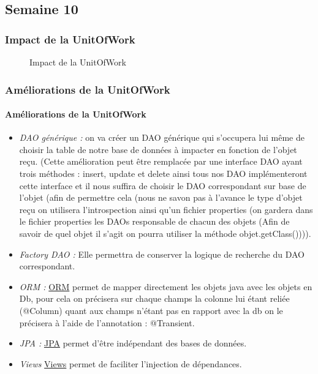 \documentclass{article}[12pt]
\begin{document}
\subsection{Semaine 10}
\subsubsection{Impact de la UnitOfWork}
\begin{figure}[H]
    \centering
    \caption{Impact de la UnitOfWork}
\end{figure}
\subsubsection{Améliorations de la UnitOfWork}
\paragraph{Améliorations de la UnitOfWork}
\begin{itemize}
	\item \emph{DAO générique :} on va créer un DAO générique qui s'occupera lui même de choisir la table de notre base de données à impacter en fonction de l'objet reçu. (Cette amélioration peut être remplacée par une interface DAO ayant trois méthodes : insert, update et delete ainsi tous nos DAO implémenteront cette interface et il nous suffira de choisir le DAO correspondant sur base de l'objet (afin de permettre cela (nous ne savon pas à l'avance le type d'objet reçu on utilisera l’introspection ainsi qu'un fichier properties (on gardera dans le fichier properties les DAOs responsable de chacun des objets (Afin de savoir de quel objet il s'agit on pourra utiliser la méthode objet.getClass()))).
    \item \emph{Factory DAO : } Elle permettra de conserver la logique de recherche du DAO correspondant.
    \item \emph{ORM : } \href{http://hibernate.org/orm/documentation/5.2/}{ORM} permet de mapper directement les objets java avec les objets en Db, pour cela on précisera sur chaque champs la colonne lui étant reliée (@Column) quant aux champs n'étant pas en rapport avec la db on le précisera à l'aide de l'annotation : @Transient.
    \item \emph{JPA : } \href{https://openclassrooms.com/courses/creez-votre-application-web-avec-java-ee/la-persistance-des-donnees-avec-jpa}{JPA} permet d'être indépendant des bases de données.
    \item \emph{Views} \href{https://docs.microsoft.com/en-us/aspnet/core/mvc/views/dependency-injection}{Views} permet de faciliter l'injection de dépendances.
\end{itemize}
\end{document}
